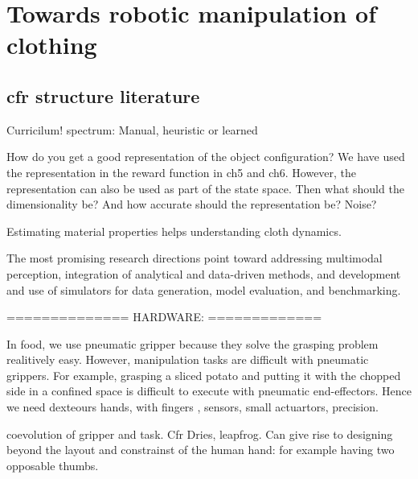 \documentclass[\home/main.tex]{subfiles}
\begin{document}
\chapter{Towards robotic manipulation of clothing }\label{ch:towards_robotic_folding}
%   

\section{cfr structure literature}

Curricilum!  spectrum: Manual, heuristic or learned


How do you get a good representation of the object configuration?
    We have used the representation in the reward function in ch5 and ch6. However, the representation can also be used as part of the state space. Then what should the dimensionality be? And how accurate should the representation be? Noise? 

Estimating material properties helps understanding cloth dynamics. 


The most promising research directions point toward addressing multimodal perception, integration of analytical and data-driven methods, and development and use of simulators for data generation, model evaluation, and benchmarking.



==============
HARDWARE:
=============

In food, we use pneumatic gripper because they solve the grasping problem realitively easy. However, manipulation tasks are difficult with pneumatic grippers. For example, grasping a sliced potato and putting it with the chopped side in a confined space is difficult to execute with pneumatic end-effectors. Hence we need dexteours hands, with fingers , sensors, small actuartors, precision. 

coevolution of gripper and task. Cfr Dries, leapfrog. 
Can give rise to designing beyond the layout and constrainst of the human hand: for example having two opposable thumbs. %
\end{document}

